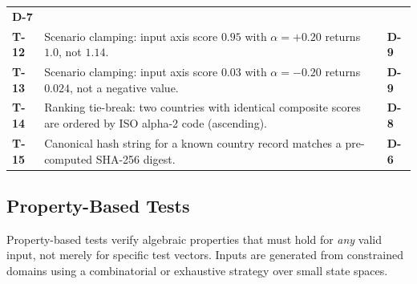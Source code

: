 \begin{longtable}{@{}l >{\raggedright\arraybackslash}p{6cm} l@{}}
    \textbf{D-7} \\
  \textbf{T-12} & Scenario clamping: input axis score \(0.95\) with
    \(\alpha = +0.20\) returns \(1.0\), not \(1.14\). & \textbf{D-9} \\
  \textbf{T-13} & Scenario clamping: input axis score \(0.03\) with
    \(\alpha = -0.20\) returns \(0.024\), not a negative value. &
    \textbf{D-9} \\
  \textbf{T-14} & Ranking tie-break: two countries with identical composite
    scores are ordered by ISO alpha-2 code (ascending). & \textbf{D-8} \\
  \textbf{T-15} & Canonical hash string for a known country record matches
    a pre-computed SHA-256 digest. & \textbf{D-6} \\
\end{longtable}

\subsection{Property-Based Tests}\label{sec:test:property}

Property-based tests verify algebraic properties that must hold for
\emph{any} valid input, not merely for specific test vectors.  Inputs are
generated from constrained domains using a combinatorial or exhaustive
strategy over small state spaces.

